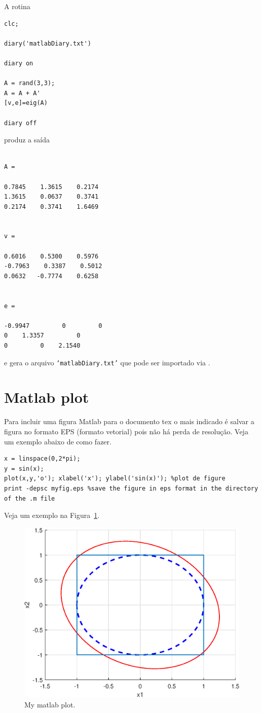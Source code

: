 \documentclass[a4paper,12pt]{article}
\begin{document}
A rotina 
\begin{lstlisting}
clc;

diary('matlabDiary.txt')

diary on

A = rand(3,3);
A = A + A'
[v,e]=eig(A)

diary off
\end{lstlisting}
produz a saída
\begin{lstlisting}

A =

0.7845    1.3615    0.2174
1.3615    0.0637    0.3741
0.2174    0.3741    1.6469


v =

0.6016    0.5300    0.5976
-0.7963    0.3387    0.5012
0.0632   -0.7774    0.6258


e =

-0.9947         0         0
0    1.3357         0
0         0    2.1540
\end{lstlisting}
e gera o arquivo \texttt{`matlabDiary.txt'} que pode ser importado via \verb||.




\section*{Matlab plot}

Para incluir uma figura Matlab para o documento tex o mais indicado é salvar a figura no formato EPS (formato vetorial) pois não há perda de resolução. Veja um exemplo abaixo de como fazer.
\begin{lstlisting}
x = linspace(0,2*pi);
y = sin(x);
plot(x,y,'o'); xlabel('x'); ylabel('sin(x)'); %plot de figure
print -depsc myfig.eps %save the figure in eps format in the directory of the .m file
\end{lstlisting}

Veja um exemplo na Figura~\ref{fig:theFig}.
\begin{figure}[H]
	\centerline{\includegraphics[scale=0.6]{figmatlab}}		
	\caption{My matlab plot. \label{fig:theFig}}
\end{figure}
\end{document}

